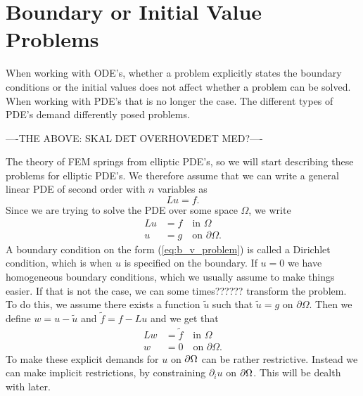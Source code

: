 \section{Boundary or Initial Value Problems}
When working with ODE's,
whether a problem explicitly states the boundary conditions 
or the initial values does not affect whether a problem can be solved.
When working with 
PDE's that is no longer the case. The different types 
of PDE's demand differently posed problems. 


----THE ABOVE\@: SKAL DET OVERHOVEDET MED?----


The theory of FEM springs from elliptic PDE's, so we will start 
describing these problems for elliptic PDE's.
We therefore assume that we can write a general linear PDE of second 
order with $n$ variables as 
\begin{equation*}
    Lu = f.
\end{equation*}
Since we are trying to solve the PDE over some space $\Omega$, we write
\begin{align}
    Lu &= f \quad \text{in } \Omega \label{eq:b_v_problem} \\
    u &= g \quad \text{on } \partial \Omega. \nonumber
\end{align}
A boundary condition on the form (\ref{eq:b_v_problem}) is called a 
Dirichlet condition, which is when $u$ is specified on the boundary. 
If $u=0$ we have homogeneous boundary conditions, which we usually assume 
to make things easier. If that is not the case, we can some times?????? 
transform the problem. To do this, we assume there exists a function 
$\tilde{u}$ such that $\tilde{u}=g$ on $\partial \Omega$. Then we define 
$w = u - \tilde{u}$ and $\tilde{f}=f-Lu$ and we get that
\begin{align}
    Lw &= \tilde{f} \quad \text{in } \Omega \label{eq:b_v_problem_homogeneous} \\
    w &= 0 \quad \text{on } \partial \Omega. \nonumber
\end{align}
To make these explicit demands for $u$ on $\partial \Omega$ can 
be rather restrictive.
Instead we can make implicit restrictions, by constraining 
$\partial _i u$ on $\partial \Omega$.
This will be dealth with later.